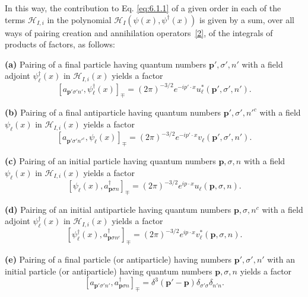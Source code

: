In this way, the contribution to Eq. \eqref{eq:6.1.1} of a given order in each of the
terms $\mathcal H_{I,i}$ in the polynomial
$\mathcal H_I(\psi(x),\psi^\dagger(x))$ is given by a sum, over all ways of
pairing creation and annihilation operators~\hyperref[ref:6.2]{[2]}, of the integrals of products
of factors, as follows:

\noindent\textbf{(a)} Pairing of a final particle having quantum numbers
$\mathbf p',\sigma',n'$ with a field adjoint $\psi_\ell^\dagger(x)$ in
$\mathcal H_{I,i}(x)$ yields a factor
\begin{equation}
\left[a_{\mathbf p'\sigma'n'},\psi_\ell^\dagger(x)\right]_{\mp}
=(2\pi)^{-3/2}e^{-ip'\cdot x}u_\ell^*(\mathbf p',\sigma',n').
\tag{6.1.9}
\label{eq:6.1.9}
\end{equation}

\noindent\textbf{(b)} Pairing of a final antiparticle having quantum numbers
$\mathbf p',\sigma',n'^c$ with a field $\psi_\ell(x)$ in
$\mathcal H_{I,i}(x)$ yields a factor
\begin{equation}
\left[a_{\mathbf p'\sigma'n'^c},\psi_\ell(x)\right]_{\mp}
=(2\pi)^{-3/2}e^{-ip'\cdot x}v_\ell(\mathbf p',\sigma',n').
\tag{6.1.10}
\label{eq:6.1.10}
\end{equation}

\noindent\textbf{(c)} Pairing of an initial particle having quantum numbers
$\mathbf p,\sigma,n$ with a field $\psi_\ell(x)$ in
$\mathcal H_{I,i}(x)$ yields a factor
\begin{equation}
\left[\psi_\ell(x),a^\dagger_{\mathbf p\sigma n}\right]_{\mp}
=(2\pi)^{-3/2}e^{ip\cdot x}u_\ell(\mathbf p,\sigma,n).
\tag{6.1.11}
\label{eq:6.1.11}
\end{equation}

\noindent\textbf{(d)} Pairing of an initial antiparticle having quantum
numbers $\mathbf p,\sigma,n^c$ with a field adjoint
$\psi_\ell^\dagger(x)$ in $\mathcal H_{I,i}(x)$ yields a factor
\begin{equation}
\left[\psi_\ell^\dagger(x),a^\dagger_{\mathbf p\sigma n^c}\right]_{\mp}
=(2\pi)^{-3/2}e^{ip\cdot x}v_\ell^*(\mathbf p,\sigma,n).
\tag{6.1.12}
\label{eq:6.1.12}
\end{equation}

\noindent\textbf{(e)} Pairing of a final particle (or antiparticle) having
numbers $\mathbf p',\sigma',n'$ with an initial particle (or antiparticle)
having quantum numbers $\mathbf p,\sigma,n$ yields a factor
\begin{equation}
\left[a_{\mathbf p'\sigma'n'},a^\dagger_{\mathbf p\sigma n}\right]_{\mp}
=\delta^3(\mathbf p'-\mathbf p)\delta_{\sigma'\sigma}\delta_{n'n}.
\tag{6.1.13}
\label{eq:6.1.13}
\end{equation}

